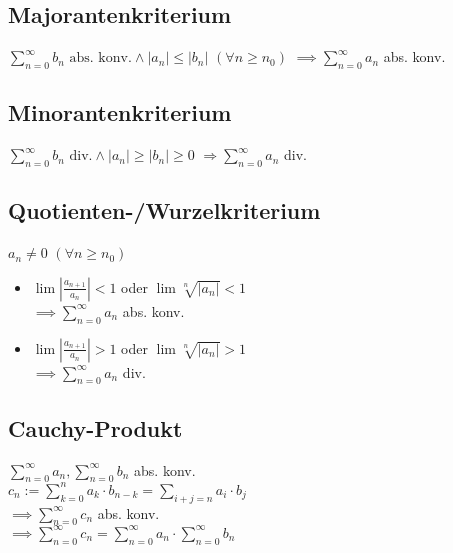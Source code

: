 \subsection*{Majorantenkriterium}
$\displaystyle \sum_{n=0}^\infty b_n \text{ abs. konv.} \land |a_n|\le|b_n|$ $(\forall n\ge n_0)$
$\displaystyle \implies \sum_{n=0}^\infty a_n$ abs. konv.

\subsection*{Minorantenkriterium}
$\displaystyle \sum_{n=0}^\infty b_n \text{ div.} \land |a_n|\ge|b_n|\ge0$
$\displaystyle \Rightarrow \sum_{n=0}^\infty a_n$ div.

\subsection*{Quotienten-/Wurzelkriterium}
$a_n \neq 0$ $(\forall n\ge n_0)$
\begin{itemize}
	\item $\displaystyle \lim\left|\frac{a_{n+1}}{a_n}\right|<1$ oder $\displaystyle \lim\sqrt[n]{|a_n|}<1$\\
		$\displaystyle \implies \sum_{n=0}^\infty a_n$ abs. konv.
	\item $\displaystyle \lim\left|\frac{a_{n+1}}{a_n}\right|>1$ oder $\displaystyle \lim\sqrt[n]{|a_n|}>1$\\
		$\displaystyle \implies \sum_{n=0}^\infty a_n$ div.
\end{itemize}

\subsection*{Cauchy-Produkt}
$\displaystyle \sum_{n=0}^\infty a_n, \sum_{n=0}^\infty b_n$ abs. konv. \\
$\displaystyle c_n := \sum_{k=0}^n a_k\cdot b_{n-k}= \sum_{i+j=n}a_i\cdot b_j$ \\
$\displaystyle \implies \sum_{n=0}^\infty c_n$ abs. konv. \\
$\displaystyle \implies \sum_{n=0}^\infty c_n=\sum_{n=0}^\infty a_n \cdot \sum_{n=0}^\infty b_n$
